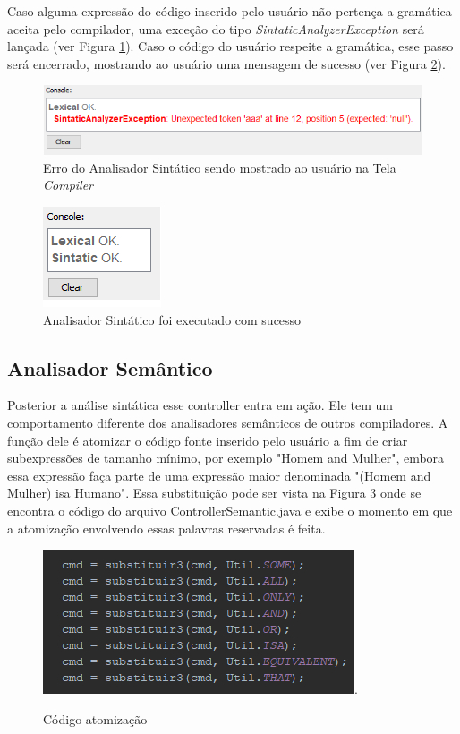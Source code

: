 \documentclass{bcc}
\begin{document}
Caso alguma expressão do código inserido pelo usuário não pertença a gramática aceita pelo compilador, uma exceção do tipo \textit{SintaticAnalyzerException} será lançada (ver Figura \ref{fig:codigoErroSintatico}). Caso o código do usuário respeite a gramática, esse passo será encerrado, mostrando ao usuário uma mensagem de sucesso (ver Figura \ref{fig:codigoSucessoSintatico}).


\begin{figure}[H]
\centering
\includegraphics[width=.7\textwidth]{Figuras/codigo_erro_sintatico.png}
\caption{Erro do Analisador Sintático sendo mostrado ao usuário na Tela \textit{Compiler}}
\label{fig:codigoErroSintatico}
\end{figure}

\begin{figure}[H]
\centering
\includegraphics[width=.2\textwidth]{Figuras/codigo_sucesso_sintatico.png}
\caption{Analisador Sintático foi executado com sucesso}
\label{fig:codigoSucessoSintatico}
\end{figure}

\subsection{Analisador Semântico}

Posterior a análise sintática esse controller entra em ação. Ele tem um comportamento diferente dos analisadores semânticos de outros compiladores. A função dele é atomizar o código fonte inserido pelo usuário a fim de criar subexpressões de tamanho mínimo, por exemplo "Homem and Mulher", embora essa expressão faça parte de uma expressão maior denominada "(Homem and Mulher) isa Humano". Essa substituição pode ser vista na Figura \ref{fig:codigoAtomizacao} onde se encontra o código do arquivo ControllerSemantic.java e exibe o momento em que a atomização envolvendo essas palavras reservadas é feita. 

\begin{figure}[H]
\centering
\includegraphics[width=.7\textwidth]{Figuras/codigo_atomizacao.png}.
\caption{Código atomização}
\label{fig:codigoAtomizacao}
\end{figure}
\end{document}
